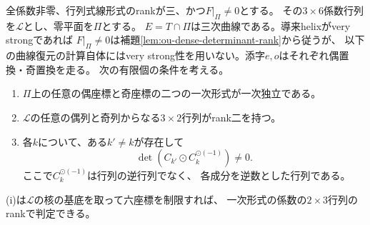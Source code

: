 全係数非零、行列式線形式のrankが三、かつ$F|_\Pi\ne0$とする。
その$3\times6$係数行列を$\mathcal L$とし、零平面を$\Pi$とする。
$E=T\cap\Pi$は三次曲線である。導来helixがvery strongであれば
$F|_\Pi\ne0$は補題\ref{lem:ou-dense-determinant-rank}から従うが、
以下の曲線復元の計算自体にはvery strong性を用いない。添字$e,o$はそれぞれ偶置換・奇置換を走る。
次の有限個の条件を考える。
\begin{enumerate}[label=(\roman*)]
\item\label{item:ou-grid-independent}
$\Pi$上の任意の偶座標と奇座標の二つの一次形式が一次独立である。
\item\label{item:ou-grid-minors}
$\mathcal L$の任意の偶列と奇列からなる$3\times2$行列がrank二を持つ。
\item\label{item:ou-torus-rank-drop}
各$k$について、ある$k'\ne k$が存在して
\[
 \det\left(C_{k'}\odot C_k^{\odot(-1)}\right)\ne0 .
\]
ここで$C_k^{\odot(-1)}$は行列の逆行列でなく、
各成分を逆数とした行列である。
\end{enumerate}
(i)は$\mathcal L$の核の基底を取って六座標を制限すれば、
一次形式の係数の$2\times3$行列のrankで判定できる。

